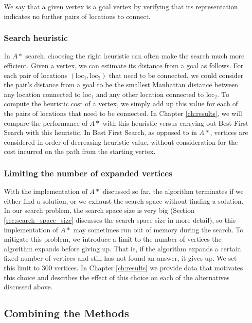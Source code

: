 We say that a given vertex is a goal vertex by verifying that its
representation indicates no further pairs of locations to connect.

\subsubsection{Search heuristic}

In $A*$ search, choosing the right heuristic can often make the search much more
efficient. Given a
vertex, we can estimate its distance from a goal as follows. For each pair of
locations $(\text{loc}_1, \text{loc}_2)$ that need to be connected, we could
consider the pair's distance from a
goal to be the smallest Manhattan distance between any location connected to
$\text{loc}_1$ and any other location connected to $\text{loc}_2$.
To compute the heuristic
cost of a vertex, we simply add up this value for each of the pairs of locations
that need to be connected. In Chapter \ref{ch:results}, we will compare the
performance of $A*$ with this heuristic versus carrying out Best First Search
with this heuristic. In Best First Search, as opposed to in $A*$, vertices are
considered in order of decreasing heuristic value, without consideration for
the cost incurred on the path from the starting vertex.

\subsubsection{Limiting the number of expanded vertices}

With the implementation of $A*$ discussed so far, the algorithm
terminates if we either find a solution, or we
exhaust the search space without finding a solution. In our search problem, the
search space size is very big (Section \ref{sec:search_space_size} discusses
the search space size
in more detail), so this implementation of $A*$ may sometimes run out
of memory during the search. To mitigate this problem, we introduce a limit to
the number of vertices the algorithm expands before giving up. That is, if the
algorithm expands a certain fixed number of vertices and still has not found an
answer, it gives up. We set this limit to $300$ vertices.
In Chapter \ref{ch:results} we provide data that motivates this choice and
describes the effect of this choice on each of the alternatives discussed above.

\subsection{Combining the Methods}
\label{sec:combined_alg}

